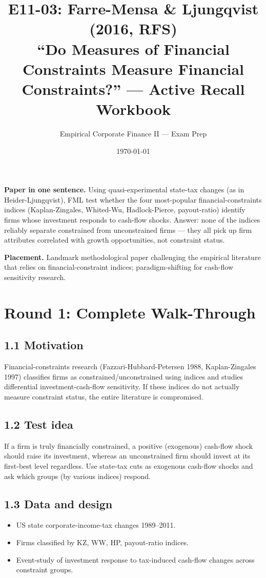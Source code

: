 \documentclass[11pt]{article}
\title{E11-03: Farre-Mensa \& Ljungqvist (2016, RFS) \\
\large ``Do Measures of Financial Constraints Measure Financial Constraints?'' --- Active Recall Workbook}
\author{Empirical Corporate Finance II --- Exam Prep}
\date{\today}
\begin{document}
\maketitle

\begin{keybox}
\textbf{Paper in one sentence.} Using quasi-experimental state-tax changes (as in Heider-Ljungqvist), FML test whether the four most-popular financial-constraints indices (Kaplan-Zingales, Whited-Wu, Hadlock-Pierce, payout-ratio) identify firms whose investment responds to cash-flow shocks. Answer: none of the indices reliably separate constrained from unconstrained firms --- they all pick up firm attributes correlated with growth opportunities, not constraint status.

\textbf{Placement.} Landmark methodological paper challenging the empirical literature that relies on financial-constraint indices; paradigm-shifting for cash-flow sensitivity research.
\end{keybox}

\section*{Round 1: Complete Walk-Through}

\subsection*{1.1 Motivation}
Financial-constraints research (Fazzari-Hubbard-Petersen 1988, Kaplan-Zingales 1997) classifies firms as constrained/unconstrained using indices and studies differential investment-cash-flow sensitivity. If these indices do not actually measure constraint status, the entire literature is compromised.

\subsection*{1.2 Test idea}
If a firm is truly financially constrained, a positive (exogenous) cash-flow shock should raise its investment, whereas an unconstrained firm should invest at its first-best level regardless. Use state-tax cuts as exogenous cash-flow shocks and ask which groups (by various indices) respond.

\subsection*{1.3 Data and design}
\begin{itemize}
\item US state corporate-income-tax changes 1989--2011.
\item Firms classified by KZ, WW, HP, payout-ratio indices.
\item Event-study of investment response to tax-induced cash-flow changes across constraint groups.
\end{itemize}
\end{document}

